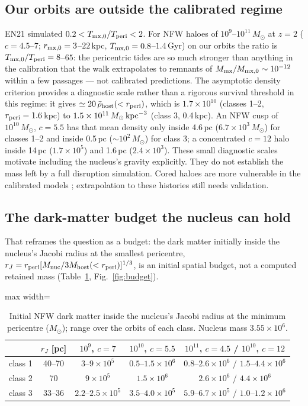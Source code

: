 \documentclass[11pt,a4paper]{article}
\newcommand{\Msun}{M_\odot}
\begin{document}
\subsection{Our orbits are outside the calibrated regime}
EN21 simulated $0.2<T_{\rm mx,0}/T_{\rm peri}<2$. For NFW haloes of $10^{9}$--$10^{11}\,\Msun$
at $z=2$ ($c=4.5$--$7$; $r_{\rm mx,0}=3$--$22$\,kpc, $T_{\rm mx,0}=0.8$--$1.4$\,Gyr) on our
orbits the ratio is $T_{\rm mx,0}/T_{\rm peri}=8$--$65$: the pericentric tides are so much
stronger than anything in the calibration that the walk extrapolates to remnants of
$M_{\rm mx}/M_{\rm mx,0}\sim10^{-12}$ within a few passages --- not calibrated predictions. The asymptotic density criterion provides a diagnostic
scale rather than a rigorous survival threshold in this regime: it gives $\simeq20\,\bar\rho_{\rm host}(<r_{\rm peri})$, which is $1.7\times10^{10}$
(classes 1--2, $r_{\rm peri}=1.6$\,kpc) to $1.5\times10^{11}\,\Msun\,{\rm kpc}^{-3}$ (class 3,
0.4\,kpc). An NFW cusp of $10^{10}\,\Msun$, $c=5.5$ has that mean density only inside 4.6\,pc
($6.7\times10^{3}\,\Msun$) for classes 1--2 and inside 0.5\,pc ($\sim10^{2}\,\Msun$) for
class 3; a concentrated $c=12$ halo inside 14\,pc ($1.7\times10^{5}$) and 1.6\,pc
($2.4\times10^{3}$). These small diagnostic scales motivate including the nucleus's gravity explicitly.
They do not establish the mass left by a full disruption simulation. Cored haloes are
more vulnerable in the calibrated models \citep{errani2020}; extrapolation to these
histories still needs validation.

\subsection{The dark-matter budget the nucleus can hold}
That reframes the question as a budget: the dark matter initially inside the nucleus's Jacobi
radius at the smallest pericentre, $r_J=r_{\rm peri}[M_{\rm nuc}/3M_{\rm host}(<r_{\rm peri})]^{1/3}$,
is an initial spatial budget, not a computed retained mass (Table~\ref{tab:budget},
Fig.~\ref{fig:budget}).

\begin{table}[h]\centering
\caption{Initial NFW dark matter inside the nucleus's Jacobi radius at the minimum pericentre
($\Msun$); range over the orbits of each class. Nucleus mass $3.55\times10^{6}$.}
\label{tab:budget}
\begin{adjustbox}{max width=\linewidth}
\begin{tabular}{lcccc}\toprule
& $r_J$ [pc] & $10^{9}$, $c=7$ & $10^{10}$, $c=5.5$ & $10^{11}$, $c=4.5$ \quad / \quad $10^{10}$, $c=12$\\\midrule
class 1 & 40--70 & $3$--$9\times10^{5}$ & $0.5$--$1.5\times10^{6}$ & $0.8$--$2.6\times10^{6}$ / $1.5$--$4.4\times10^{6}$\\
class 2 & 70 & $9\times10^{5}$ & $1.5\times10^{6}$ & $2.6\times10^{6}$ / $4.4\times10^{6}$\\
class 3 & 33--36 & $2.2$--$2.5\times10^{5}$ & $3.5$--$4.0\times10^{5}$ & $5.9$--$6.7\times10^{5}$ / $1.0$--$1.2\times10^{6}$\\
\bottomrule\end{tabular}
\end{adjustbox}
\end{table}
\end{document}
